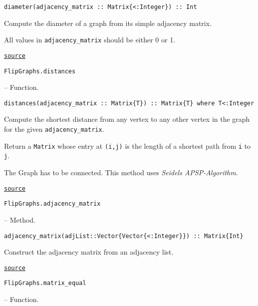 \begin{adjustwidth}{2em}{0pt}


\begin{verbatim}
diameter(adjacency_matrix :: Matrix{<:Integer}) :: Int
\end{verbatim}

Compute the diameter of a graph from its simple adjacency matrix.

All values in \texttt{adjacency\_matrix} should be either 0 or 1.



\href{https://github.com/schto223/FlipGraphs.jl/blob/e35d43698a06b86273148826b79d585ba04fcd26/src/generalUtilities.jl#L1-L7}{\texttt{source}}


\end{adjustwidth}
\hypertarget{15595577474420342013}{\texttt{FlipGraphs.distances}}  -- {Function.}

\begin{adjustwidth}{2em}{0pt}


\begin{verbatim}
distances(adjacency_matrix :: Matrix{T}) :: Matrix{T} where T<:Integer
\end{verbatim}

Compute the shortest distance from any vertex to any other vertex in the graph for the given \texttt{adjacency\_matrix}.

Return a \texttt{Matrix} whose entry at \texttt{(i,j)} is the length of a shortest path from \texttt{i} to \texttt{j}.

The Graph has to be connected. This method uses \emph{Seidels APSP-Algorithm}.



\href{https://github.com/schto223/FlipGraphs.jl/blob/e35d43698a06b86273148826b79d585ba04fcd26/src/generalUtilities.jl#L89-L97}{\texttt{source}}


\end{adjustwidth}
\hypertarget{16883507873940775758}{\texttt{FlipGraphs.adjacency\_matrix}}  -- {Method.}

\begin{adjustwidth}{2em}{0pt}


\begin{verbatim}
adjacency_matrix(adjList::Vector{Vector{<:Integer}}) :: Matrix{Int}
\end{verbatim}

Construct the adjacency matrix from an adjacency list.



\href{https://github.com/schto223/FlipGraphs.jl/blob/e35d43698a06b86273148826b79d585ba04fcd26/src/generalUtilities.jl#L153-L157}{\texttt{source}}


\end{adjustwidth}
\hypertarget{2902498613952484789}{\texttt{FlipGraphs.matrix\_equal}}  -- {Function.}

